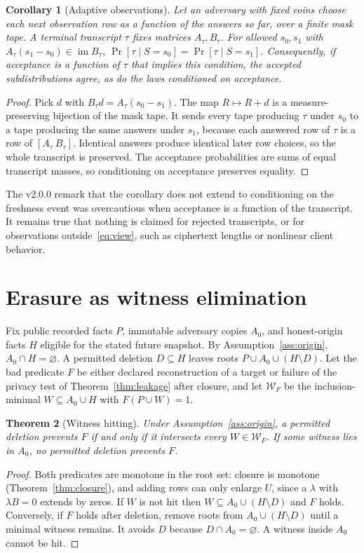 \documentclass[pdflatex,sn-mathphys-num]{sn-jnl}
\theoremstyle{plain}
\newtheorem{theorem}{Theorem}
\newtheorem{corollary}[theorem]{Corollary}
\theoremstyle{definition}
\newcommand{\im}{\operatorname{im}}
\begin{document}
\begin{corollary}[Adaptive observations]\label{cor:adaptive}
Let an adversary with fixed coins choose each next observation row as a function of the answers so far, over a finite mask tape. A terminal transcript $\tau$ fixes matrices $A_\tau,B_\tau$. For allowed $s_0,s_1$ with $A_\tau(s_1-s_0)\in\im B_\tau$, $\Pr[\tau\mid S=s_0]=\Pr[\tau\mid S=s_1]$. Consequently, if acceptance is a function of $\tau$ that implies this condition, the accepted subdistributions agree, as do the laws conditioned on acceptance.
\end{corollary}
\begin{proof}
Pick $d$ with $B_\tau d=A_\tau(s_0-s_1)$. The map $R\mapsto R+d$ is a measure-preserving bijection of the mask tape. It sends every tape producing $\tau$ under $s_0$ to a tape producing the same answers under $s_1$, because each answered row of $\tau$ is a row of $[A_\tau\ B_\tau]$. Identical answers produce identical later row choices, so the whole transcript is preserved. The acceptance probabilities are sums of equal transcript masses, so conditioning on acceptance preserves equality.
\end{proof}

The v2.0.0 remark that the corollary does not extend to conditioning on the freshness event was overcautious when acceptance is a function of the transcript. It remains true that nothing is claimed for rejected transcripts, or for observations outside~\eqref{eq:view}, such as ciphertext lengths or nonlinear client behavior.


\section{Erasure as witness elimination}\label{sec:erasure}

Fix public recorded facts $P$, immutable adversary copies $A_0$, and honest-origin facts $H$ eligible for the stated future snapshot. By Assumption~\ref{ass:origin}, $A_0\cap H=\varnothing$. A permitted deletion $D\subseteq H$ leaves roots $P\cup A_0\cup(H\setminus D)$. Let the bad predicate $F$ be either declared reconstruction of a target or failure of the privacy test of Theorem~\ref{thm:leakage} after closure, and let $\mathcal W_F$ be the inclusion-minimal $W\subseteq A_0\cup H$ with $F(P\cup W)=1$.

\begin{theorem}[Witness hitting]\label{thm:cuts}
Under Assumption~\ref{ass:origin}, a permitted deletion prevents $F$ if and only if it intersects every $W\in\mathcal W_F$. If some witness lies in $A_0$, no permitted deletion prevents $F$.
\end{theorem}
\begin{proof}
Both predicates are monotone in the root set: closure is monotone (Theorem~\ref{thm:closure}), and adding rows can only enlarge $U$, since a $\lambda$ with $\lambda B=0$ extends by zeros. If $W$ is not hit then $W\subseteq A_0\cup(H\setminus D)$ and $F$ holds. Conversely, if $F$ holds after deletion, remove roots from $A_0\cup(H\setminus D)$ until a minimal witness remains. It avoids $D$ because $D\cap A_0=\varnothing$. A witness inside $A_0$ cannot be hit.
\end{proof}
\end{document}
